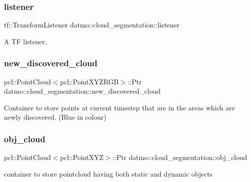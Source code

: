 \subsubsection{\texorpdfstring{listener}{listener}}
{\footnotesize\ttfamily tf\+::\+Transform\+Listener datmo\+::cloud\+\_\+segmentation\+::listener\hspace{0.3cm}{\ttfamily [protected]}}



A TF listener. 

\mbox{\label{classdatmo_1_1cloud__segmentation_ac9374ddec382dc6dab33b34542a7b21d}} 
\subsubsection{\texorpdfstring{new\+\_\+discovered\+\_\+cloud}{new\_discovered\_cloud}}
{\footnotesize\ttfamily pcl\+::\+Point\+Cloud$<$pcl\+::\+Point\+X\+Y\+Z\+R\+GB$>$\+::Ptr datmo\+::cloud\+\_\+segmentation\+::new\+\_\+discovered\+\_\+cloud\hspace{0.3cm}{\ttfamily [protected]}}



Container to store points at current timestep that are in the areas which are newly discovered. (Blue in colour) 

\mbox{\label{classdatmo_1_1cloud__segmentation_ad946a48ab59bf9f48338f9ef0702181c}} 
\subsubsection{\texorpdfstring{obj\+\_\+cloud}{obj\_cloud}}
{\footnotesize\ttfamily pcl\+::\+Point\+Cloud$<$pcl\+::\+Point\+X\+YZ$>$\+::Ptr datmo\+::cloud\+\_\+segmentation\+::obj\+\_\+cloud\hspace{0.3cm}{\ttfamily [protected]}}



container to store pointcloud having both static and dynamic objects 

